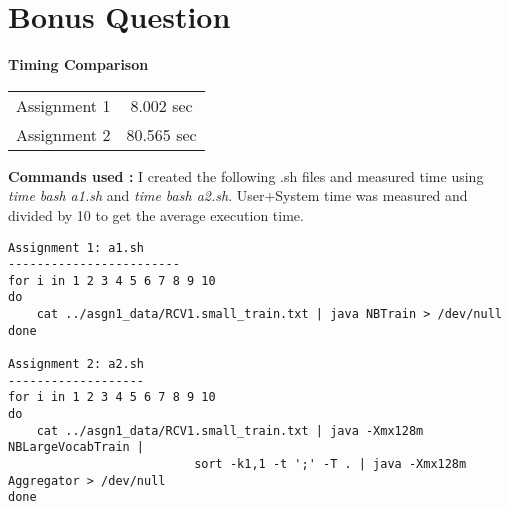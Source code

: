 \documentclass[paper=a4, fontsize=11pt]{scrartcl} %
\numberwithin{equation}{section} %
\numberwithin{figure}{section} %
\numberwithin{table}{section} %
\begin{document}
\section*{\textbf{Bonus Question}}
\textbf{Timing Comparison} \\
\begin{tabular}{| c | c |}
\hline
Assignment 1 & 8.002 sec \\
Assignment 2 & 80.565 sec \\
\hline
\end{tabular}
\vspace*{15pt}

\textbf{Commands used :} I created the following .sh files and measured time using \textit{time bash a1.sh} and \textit{time bash a2.sh}. User+System time was measured and divided by 10 to get the average execution time. 

\pagebreak
\begin{verbatim}
Assignment 1: a1.sh
------------------------
for i in 1 2 3 4 5 6 7 8 9 10
do
    cat ../asgn1_data/RCV1.small_train.txt | java NBTrain > /dev/null
done

Assignment 2: a2.sh
-------------------
for i in 1 2 3 4 5 6 7 8 9 10
do
    cat ../asgn1_data/RCV1.small_train.txt | java -Xmx128m NBLargeVocabTrain | 
                          sort -k1,1 -t ';' -T . | java -Xmx128m Aggregator > /dev/null
done
\end{verbatim}
\end{document}
